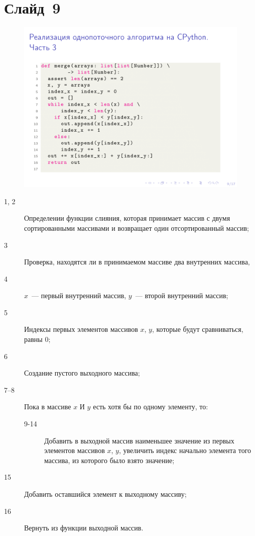 \documentclass[aps,pre,reprint]{revtex4-2}
\begin{document}
	\section{Слайд~9}
	\begin{figure}[H]
		\includegraphics[scale=.7]{presentation-09.png}
	\end{figure}
	
	\begin{description}
		\item[1, 2] Определении функции слияния, которая принимает массив с двумя сортированными массивами и возвращает один отсортированный массив;
		\item[3] Проверка, находятся ли в принимаемом массиве два внутренних массива,
		\item[4] $x$~--- первый внутренний массив, $y$~--- второй внутренний массив;
		\item[5] Индексы первых элементов массивов $x$, $y$, которые будут сравниваться, равны 0;
		\item[6] Создание пустого выходного массива;
		\item[7--8] Пока в массиве $x$ И $y$ есть хотя бы по одному элементу, то:
		\begin{description}
			\item[9-14] Добавить в выходной массив наименьшее значение из первых элементов массивов $x$, $y$, увеличить индекс начально элемента того массива, из которого было взято значение;
		\end{description}
		\item[15] Добавить оставшийся элемент к выходному массиву;
		\item[16] Вернуть из функции выходной массив.
	\end{description}
\end{document}
